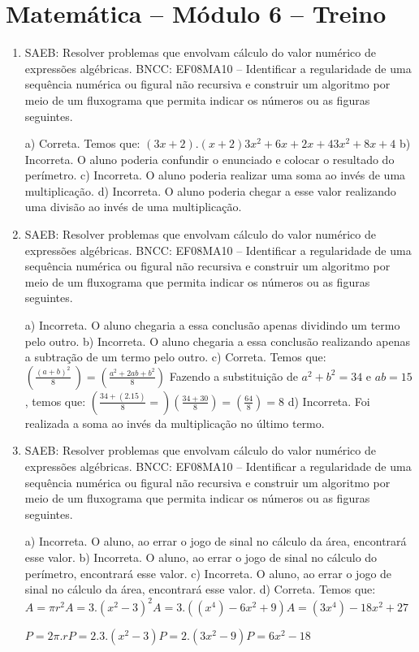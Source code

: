 \section*{Matemática – Módulo 6 – Treino}
\begin{enumerate}
\item SAEB: Resolver problemas que envolvam cálculo do valor numérico de
expressões algébricas.
BNCC: EF08MA10 -- Identificar a regularidade de uma sequência numérica
ou figural não recursiva e construir um algoritmo por meio de um
fluxograma que permita indicar os números ou as figuras seguintes.

a) Correta. Temos que:
$(3x + 2) . (x + 2)
3x^2 + 6x + 2x + 4
3x^2 + 8x + 4$
b) Incorreta. O aluno poderia confundir o enunciado e colocar o
resultado do perímetro.
c) Incorreta. O aluno poderia realizar uma soma ao invés de uma
multiplicação.
d) Incorreta. O aluno poderia chegar a esse valor realizando uma
divisão ao invés de uma multiplicação.

\item SAEB: Resolver problemas que envolvam cálculo do valor numérico de
expressões algébricas.
BNCC: EF08MA10 -- Identificar a regularidade de uma sequência numérica
ou figural não recursiva e construir um algoritmo por meio de um
fluxograma que permita indicar os números ou as figuras seguintes.

a) Incorreta. O aluno chegaria a essa conclusão apenas dividindo um
termo pelo outro.
b) Incorreta. O aluno chegaria a essa conclusão realizando apenas a
subtração de um termo pelo outro.
c) Correta. Temos que:
$(\frac{(a + b)^2}{8}\ ) = (\frac{a^{2} + 2ab + b^2}{8})$
Fazendo a substituição de $a^2 + b^2 = 34$ e $ab = 15$, temos que:
$(\frac{34 + (2.15)}{8} =) (\frac{34 + 30}{8}) = (\frac{64}{8}) = 8$
d) Incorreta. Foi realizada a soma ao invés da multiplicação no
último termo.

\item SAEB: Resolver problemas que envolvam cálculo do valor numérico de
expressões algébricas.
BNCC: EF08MA10 -- Identificar a regularidade de uma sequência numérica
ou figural não recursiva e construir um algoritmo por meio de um
fluxograma que permita indicar os números ou as figuras seguintes.

a) Incorreta. O aluno, ao errar o jogo de sinal no cálculo da área,
encontrará esse valor.
b) Incorreta. O aluno, ao errar o jogo de sinal no cálculo do
perímetro, encontrará esse valor.
c) Incorreta. O aluno, ao errar o jogo de sinal no cálculo da área,
encontrará esse valor.
d) Correta. Temos que:
$A = \pi r^{2}
A = 3 . (x^2-3) ^2
A = 3 . ((x^4) - 6x^2 + 9)
A = (3x^4) - 18x^2 + 27$

$P= 2\pi . r
P = 2 . 3. (x^2-3)
P = 2 . (3x^2 - 9)
P = 6x^2 - 18$
\end{enumerate}


